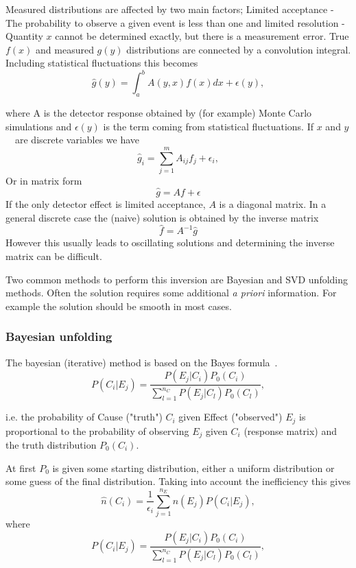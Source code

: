  
Measured distributions are affected by two main factors; Limited acceptance - The probability to observe a given event is less than one and limited resolution - Quantity $x$ cannot be determined exactly, but there is a measurement error. True $f(x)$ and measured $g(y)$ distributions are connected by a convolution integral. Including statistical fluctuations this becomes
$$\hat g(y) = \int_a^b A\left(y,x\right) f(x) dx + \epsilon(y),$$

where A is the detector response obtained by (for example) Monte Carlo simulations and $\epsilon(y)$ is the term coming from statistical fluctuations.
If $x$ and $y$~ are discrete variables we have
$$\hat g_i = \sum_{j=1}^m A_{ij}f_j+\epsilon_i,$$
Or in matrix form
$$\hat g = Af+\epsilon$$
If the only detector effect is limited acceptance, $A$ is a diagonal matrix. In a general discrete case the (naive) solution is obtained by the inverse matrix
$$\hat f = A^{-1}\hat g $$
However this usually leads to oscillating solutions and determining the inverse matrix can be difficult.

Two common methods to perform this inversion are Bayesian and SVD unfolding methods. Often the solution requires some additional {\emph{ a priori}} information. For example the solution should be smooth in most cases.

\subsubsection{Bayesian unfolding}
The bayesian (iterative) method is based on the Bayes formula~\cite{}.
$$P\left(C_i |E_j\right)=\frac{P\left(E_j |C_i\right)P_0\left(C_i\right)}{\sum_{l=1}^{n_C}P\left(E_j |C_l\right)P_0\left(C_l\right)},$$

i.e. the probability of Cause ("truth") $C_i$ given Effect ("observed") $E_j$ is proportional to the probability of observing $E_j$ given $C_i$ (response matrix) and the truth distribution $P_0\left(C_i\right)$.

At first $P_0$ is given some starting distribution, either a uniform distribution or some guess of the final distribution. Taking into account the inefficiency this gives $$\hat n\left(C_i\right) = \frac{1}{\epsilon_i} \sum_{j=1}^{n_E}n\left(E_j\right)P\left(C_i | E_j\right), $$
where 
$$P\left(C_i |E_j\right)=\frac{P\left(E_j |C_i\right)P_0\left(C_i\right)}{\sum_{l=1}^{n_C}P\left(E_j |C_l\right)P_0\left(C_l\right)},$$

